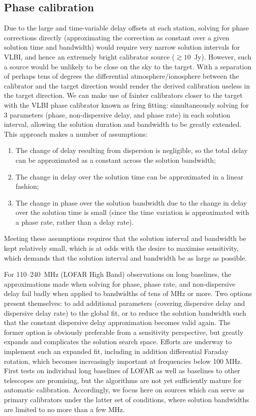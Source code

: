 \documentclass[graybox]{svmult}
\begin{document}
\subsection{Phase calibration}
Due to the large and time-variable delay offsets at each station, solving for
phase corrections directly (approximating the correction as constant over a
given solution time and bandwidth) would require very narrow solution intervals
for VLBI, and hence an extremely bright calibrator source ($\gtrsim10$~Jy).
However, such a source would be unlikely to be close on the sky to the target.
With a separation of perhaps tens of degrees the differential
atmosphere/ionosphere between the calibrator and the target direction would
render the derived calibration useless in the target direction. We can make use
of fainter calibrators closer to the target with the VLBI phase calibrator
known as fring fitting: simultaneously solving for 3 parameters (phase,
non-dispersive delay, and phase rate) in each solution interval, allowing the
solution duration and bandwidth to be greatly extended.  This approach makes a
number of assumptions:

\begin{enumerate}
\item The change of delay resulting from dispersion is negligible,
so the total delay can be approximated as a constant across the solution
bandwidth;
\item The change in delay over the solution time can be approximated in a linear
fashion;
\item The change in phase over the solution bandwidth due to the change in delay
over the solution time is small (since the time variation is approximated with a
phase rate, rather than a delay rate).
\end{enumerate}

Meeting these assumptions requires that the solution interval and bandwidth be
kept relatively small, which is at odds with the desire to maximise sensitivity,
which demands that the solution interval and bandwidth be as large as possible.

For 110--240~MHz (LOFAR High Band) observations on long baselines, the
approximations made when solving for phase, phase rate, and non-dispersive delay
fail badly when applied to bandwidths of tens of MHz or more.  Two options
present themselves: to add additional parameters (covering dispersive delay and
dispersive delay rate) to the global fit, or to reduce the solution bandwidth
such that the constant dispersive delay approximation becomes valid again.  The
former option is obviously preferable from a sensitivity perspective, but
greatly expands and complicates the solution search space.  Efforts are underway
to implement such an expanded fit, including in addition differential Faraday
rotation, which becomes increasingly important at frequencies below 100 MHz.
First tests on individual long baselines of LOFAR as well as baselines to other
telescopes are promising, but the algorithms are not yet sufficiently mature for
automatic calibration.  Accordingly, we focus here on sources which can serve as
primary calibrators under the latter set of conditions, where solution
bandwidths are limited to no more than a few MHz.
\end{document}
